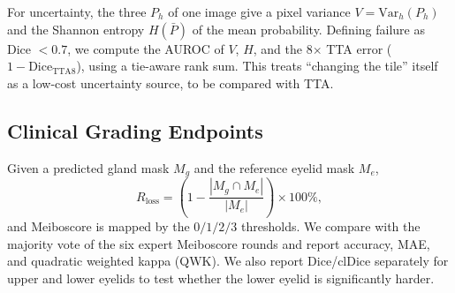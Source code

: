 For uncertainty, the three $P_h$ of one image give a pixel variance $V=\mathrm{Var}_h(P_h)$ and the Shannon entropy $H(\bar P)$ of the mean probability. Defining failure as Dice $<0.7$, we compute the AUROC of $V$, $H$, and the 8$\times$ TTA error ($1-\mathrm{Dice}_{\mathrm{TTA8}}$), using a tie-aware rank sum. This treats ``changing the tile'' itself as a low-cost uncertainty source, to be compared with TTA.

\subsection{Clinical Grading Endpoints}\label{sec:clinical}

Given a predicted gland mask $M_g$ and the reference eyelid mask $M_e$,
\begin{equation}
R_{\mathrm{loss}}=\left(1-\frac{|M_g\cap M_e|}{|M_e|}\right)\times100\%,
\end{equation}
and Meiboscore is mapped by the $0/1/2/3$ thresholds. We compare with the majority vote of the six expert Meiboscore rounds and report accuracy, MAE, and quadratic weighted kappa (QWK). We also report Dice/clDice separately for upper and lower eyelids to test whether the lower eyelid is significantly harder.
